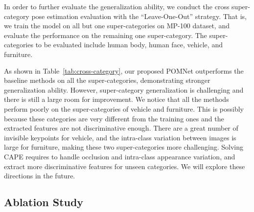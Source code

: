 \documentclass[runningheads]{llncs}
\begin{document}
In order to further evaluate the generalization ability, we conduct the cross super-category pose estimation evaluation with the ``Leave-One-Out'' strategy.
That is, we train the model on all but one super-categories on MP-100 dataset, and evaluate the performance on the remaining one super-category. The super-categories to be evaluated include human body, human face, vehicle, and furniture.

As shown in Table~\ref{tab:cross-category}, our proposed POMNet outperforms the baseline methods on all the super-categories, demonstrating stronger generalization ability. However, super-category generalization is challenging and there is still a large room for improvement. We notice that all the methods perform poorly on the super-categories of vehicle and furniture. This is possibly because these categories are very different from the training ones and the extracted features are not discriminative enough. There are a great number of invisible keypoints for vehicle, and the intra-class variation between images is large for furniture, making these two super-categories more challenging. Solving CAPE requires to handle occlusion and intra-class appearance variation, and extract more discriminative features for unseen categories. We will explore these directions in the future.


\subsection{Ablation Study}

\begin{table*}[t]
    \setlength\tabcolsep{6pt}
	\caption{Ablation study of proposed components on MP-100 Split1 under 1-shot setting. KIM and MH significantly improve the model performance.}
	\label{tab:ablation}
	\begin{center}
	\end{center}
\end{table*}
\end{document}
